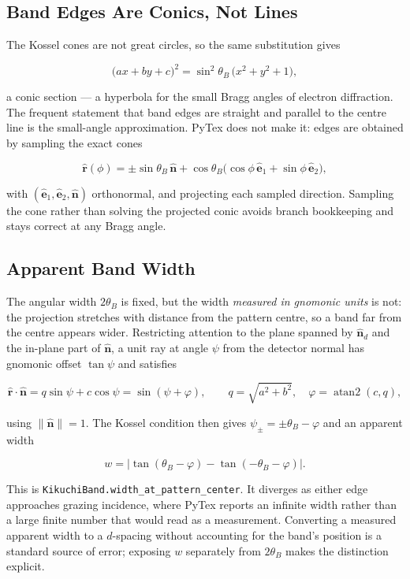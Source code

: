 \subsection{Band Edges Are Conics, Not Lines}

The Kossel cones are not great circles, so the same substitution gives

\[
  \bigl(a x + b y + c\bigr)^2 = \sin^2\theta_B \,\bigl(x^2 + y^2 + 1\bigr),
\]

a conic section --- a hyperbola for the small Bragg angles of electron
diffraction. The frequent statement that band edges are straight and parallel to
the centre line is the small-angle approximation. PyTex does not make it: edges
are obtained by sampling the exact cones

\[
  \hat{\mathbf{r}}(\phi) = \pm\sin\theta_B\, \hat{\mathbf{n}}
    + \cos\theta_B \bigl(\cos\phi\, \hat{\mathbf{e}}_1
                         + \sin\phi\, \hat{\mathbf{e}}_2\bigr),
\]

with $(\hat{\mathbf{e}}_1, \hat{\mathbf{e}}_2, \hat{\mathbf{n}})$ orthonormal,
and projecting each sampled direction. Sampling the cone rather than solving the
projected conic avoids branch bookkeeping and stays correct at any Bragg angle.

\subsection{Apparent Band Width}

The angular width $2\theta_B$ is fixed, but the width \emph{measured in gnomonic
units} is not: the projection stretches with distance from the pattern centre, so
a band far from the centre appears wider. Restricting attention to the plane
spanned by $\hat{\mathbf{n}}_d$ and the in-plane part of $\hat{\mathbf{n}}$, a
unit ray at angle $\psi$ from the detector normal has gnomonic offset $\tan\psi$
and satisfies

\[
  \hat{\mathbf{r}} \cdot \hat{\mathbf{n}}
    = q \sin\psi + c \cos\psi
    = \sin(\psi + \varphi),
  \qquad
  q = \sqrt{a^2 + b^2},
  \quad
  \varphi = \operatorname{atan2}(c, q),
\]

using $\lVert \hat{\mathbf{n}} \rVert = 1$. The Kossel condition then gives
$\psi_\pm = \pm\theta_B - \varphi$ and an apparent width

\[
  w = \bigl\lvert \tan(\theta_B - \varphi) - \tan(-\theta_B - \varphi) \bigr\rvert .
\]

This is \texttt{KikuchiBand.width\_at\_pattern\_center}. It diverges as either
edge approaches grazing incidence, where PyTex reports an infinite width rather
than a large finite number that would read as a measurement. Converting a
measured apparent width to a $d$-spacing without accounting for the band's
position is a standard source of error; exposing $w$ separately from
$2\theta_B$ makes the distinction explicit.

